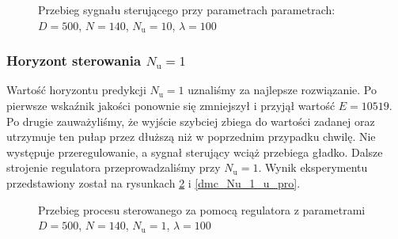 \begin{figure}[b]
    \centering
    \caption{Przebieg sygnału sterującego przy parametrach parametrach: $D = 500$, $N = 140$, $N_{\mathrm{u}} = 10$, $\lambda = 100$}
    \label{dmc_Nu_10_u_lab}
\end{figure}

\subsubsection{Horyzont sterowania $N_{\mathrm{u}} = 1$}
Wartość horyzontu predykcji $N_{\mathrm{u}} = 1$ uznaliśmy za najlepsze rozwiązanie. Po pierwsze wskaźnik jakości ponownie się zmniejszył i przyjął wartość $E = \num{10519}$. Po drugie zauważyliśmy, że wyjście szybciej zbiega do wartości zadanej oraz utrzymuje ten pułap przez dłuższą niż w poprzednim przypadku chwilę. Nie występuje przeregulowanie, a sygnał sterujący wciąż przebiega gładko. Dalsze strojenie regulatora przeprowadzaliśmy przy $N_{\mathrm{u}} = 1$. Wynik eksperymentu przedstawiony został na rysunkach \ref{dmc_Nu_1_y_lab} i \ref{dmc_Nu_1_u_pro}.

\begin{figure}[t]
    \centering
    \caption{Przebieg procesu sterowanego za pomocą regulatora z parametrami $D = 500$, $N = 140$, $N_{\mathrm{u}} = 1$, $\lambda = 100$}
    \label{dmc_Nu_1_y_lab}
\end{figure}


